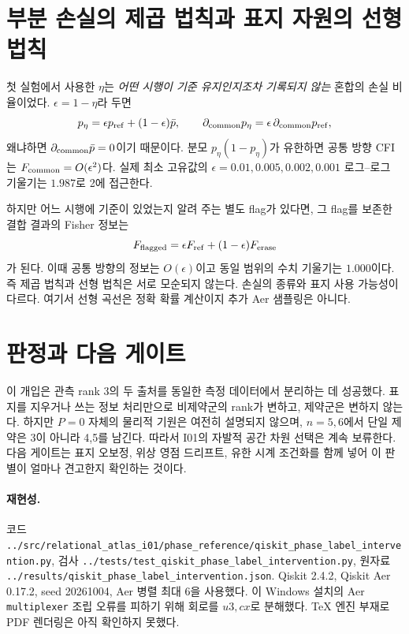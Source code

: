 \documentclass[11pt,a4paper]{article}
\begin{document}
\section{부분 손실의 제곱 법칙과 표지 자원의 선형 법칙}
첫 실험에서 사용한 $\eta$는 \emph{어떤 시행이 기준 유지인지조차
기록되지 않는} 혼합의 손실 비율이었다. $\epsilon=1-\eta$라 두면
\begin{equation}
 p_\eta=\epsilon p_{\rm ref}+(1-\epsilon)\bar p,
 \qquad
 \partial_{\rm common}p_\eta
 =\epsilon\,\partial_{\rm common}p_{\rm ref},
\end{equation}
왜냐하면 $\partial_{\rm common}\bar p=0$이기 때문이다.
분모 $p_\eta(1-p_\eta)$가 유한하면 공통 방향 CFI는
$F_{\rm common}=O(\epsilon^2)$다. 실제 최소 고유값의
$\epsilon=0.01,0.005,0.002,0.001$ 로그--로그 기울기는
$1.987$로 2에 접근한다.

하지만 어느 시행에 기준이 있었는지 알려 주는 별도 flag가
있다면, 그 flag를 보존한 결합 결과의 Fisher 정보는
\begin{equation}
 F_{\rm flagged}=\epsilon F_{\rm ref}+(1-\epsilon)F_{\rm erase}
\end{equation}
가 된다. 이때 공통 방향의 정보는 $O(\epsilon)$이고 동일 범위의
수치 기울기는 $1.000$이다. 즉 제곱 법칙과 선형 법칙은 서로
모순되지 않는다. 손실의 종류와 표지 사용 가능성이 다르다.
여기서 선형 곡선은 정확 확률 계산이지 추가 Aer 샘플링은 아니다.

\section{판정과 다음 게이트}
이 개입은 관측 rank 3의 두 출처를 동일한 측정 데이터에서
분리하는 데 성공했다. 표지를 지우거나 쓰는 정보 처리만으로
비제약군의 rank가 변하고, 제약군은 변하지 않는다. 하지만
$P=0$ 자체의 물리적 기원은 여전히 설명되지 않으며,
$n=5,6$에서 단일 제약은 3이 아니라 4,5를 남긴다.
따라서 I01의 자발적 공간 차원 선택은 계속 보류한다.
다음 게이트는 표지 오보정, 위상 영점 드리프트, 유한 시계
조건화를 함께 넣어 이 판별이 얼마나 견고한지 확인하는 것이다.

\paragraph{재현성.}
코드 \texttt{../src/relational\_atlas\_i01/phase\_reference/qiskit\_phase\_label\_intervention.py},
검사 \texttt{../tests/test\_qiskit\_phase\_label\_intervention.py},
원자료 \texttt{../results/qiskit\_phase\_label\_intervention.json}.
Qiskit 2.4.2, Qiskit Aer 0.17.2, seed 20261004,
Aer 병렬 최대 6을 사용했다. 이 Windows 설치의 Aer
\texttt{multiplexer} 조립 오류를 피하기 위해 회로를 $u3,cx$로
분해했다. TeX 엔진 부재로 PDF 렌더링은 아직 확인하지 못했다.
\end{document}
